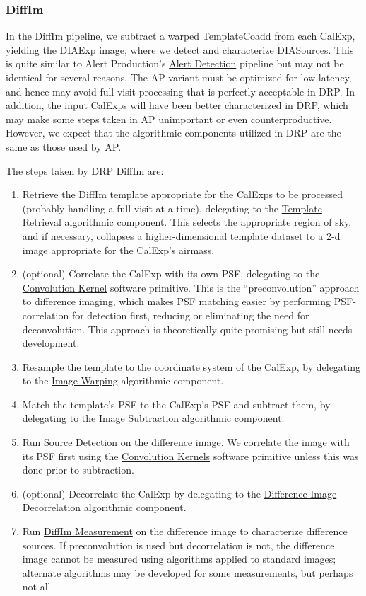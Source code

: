 \subsubsection{DiffIm}
\label{sec:drpDiffIm}

In the DiffIm pipeline, we subtract a warped TemplateCoadd from each CalExp, yielding the DIAExp image, where we detect and characterize DIASources.  This is quite similar to Alert Production's \hyperref[sec:apAlertDetection]{Alert Detection} pipeline but may not be identical for several reasons.  The AP variant must be optimized for low latency, and hence may avoid full-visit processing that is perfectly acceptable in DRP.  In addition, the input CalExps will have been better characterized in DRP, which may make some steps taken in AP unimportant or even counterproductive.  However, we expect that the algorithmic components utilized in DRP are the same as those used by AP.

The steps taken by DRP DiffIm are:
\begin{enumerate}
\item Retrieve the DiffIm template appropriate for the CalExps to be processed (probably handling a full visit at a time), delegating to the \hyperref[sec:acRetrieveTemplate]{Template Retrieval} algorithmic component.  This selects the appropriate region of sky, and if necessary, collapses a higher-dimensional template dataset to a 2-d image appropriate for the CalExp's airmass.
\item (optional) Correlate the CalExp with its own PSF, delegating to the \hyperref[sec:spKernels]{Convolution Kernel} software primitive.  This is the ``preconvolution'' approach to difference imaging, which makes PSF matching easier by performing PSF-correlation for detection first, reducing or eliminating the need for deconvolution.  This approach is theoretically quite promising but still needs development.
\item Resample the template to the coordinate system of the CalExp, by delegating to the \hyperref[sec:acWarping]{Image Warping} algorithmic component.
\item Match the template's PSF to the CalExp's PSF and subtract them, by delegating to the \hyperref[sec:acImageSubtraction]{Image Subtraction} algorithmic component.
\item Run \hyperref[sec:acSourceDetection]{Source Detection} on the difference image.  We correlate the image with its PSF first using the \hyperref[sec:spKernels]{Convolution Kernels} software primitive unless this was done prior to subtraction.
\item (optional) Decorrelate the CalExp by delegating to the \hyperref[sec:acDiffImDecorrelation]{Difference Image Decorrelation} algorithmic component.
\item Run \hyperref[sec:acDiffImMeasurement]{DiffIm Measurement} on the difference image to characterize difference sources.  If preconvolution is used but decorrelation is not, the difference image cannot be measured using algorithms applied to standard images; alternate algorithms may be developed for some measurements, but perhaps not all.
\end{enumerate}

